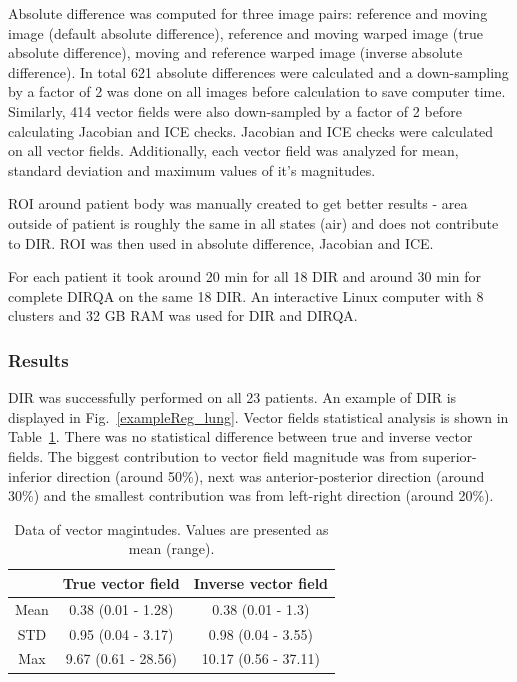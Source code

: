 \documentclass[type=dr, dr=rernat, accentcolor=tud7b,colorbacktitle, bigchapter, openright, twoside, 12pt ]{tudthesis}
\begin{document}
Absolute difference was computed for three image pairs: reference and moving image (default absolute difference), reference and moving warped image (true absolute difference), moving and reference warped image (inverse absolute difference). In total 621 absolute differences were calculated and a down-sampling by a factor of 2 was
done on all images before calculation to save computer time. Similarly, 414 vector fields were also down-sampled by a factor of 2 before calculating Jacobian and ICE checks. Jacobian and ICE checks were calculated on all vector fields. Additionally, each vector field was analyzed for mean, standard deviation and maximum values of it's magnitudes.

ROI around patient body was manually created to get better results - area outside of patient is roughly the same in all states (air) and does not contribute to DIR. ROI was then used in absolute difference, Jacobian and ICE.

For each patient it took around 20 min for all 18 DIR and around 30 min for complete DIRQA on the same 18 DIR. An interactive Linux computer with 8 clusters and 32 GB RAM was used for DIR and DIRQA.


\subsubsection{Results}

DIR was successfully performed on all 23 patients. An example of DIR is displayed in Fig.~\ref{exampleReg_lung}. Vector fields statistical analysis is shown in Table~\ref{tab:vectordata_lung}. There was no statistical
difference between true and inverse vector fields. The biggest contribution to vector field magnitude was from superior-inferior direction (around 50\%), next was anterior-posterior direction (around 30\%) and the smallest contribution was from left-right direction (around 20\%).

\begin{table}[H]
  \centering
  \caption{Data of vector magintudes. Values are presented as mean (range).}
  \begin{tabular}{c|c|c}
  
       & True vector field & Inverse vector field  \\
       \hline
       Mean & 0.38 (0.01 - 1.28) & 0.38 (0.01 - 1.3) \\ 
       STD & 0.95 (0.04 - 3.17) & 0.98 (0.04 - 3.55) \\ 
       Max & 9.67 (0.61 - 28.56) & 10.17 (0.56 - 37.11) \\
    \hline\hline
  \end{tabular}
  \label{tab:vectordata_lung}
\end{table}
\end{document}
